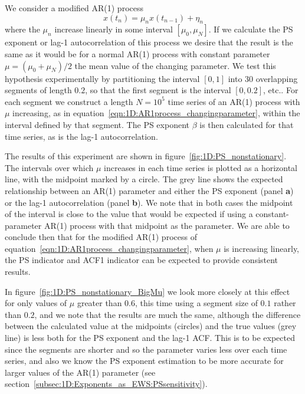{{{		We consider a modified AR(1) process
		\begin{equation}
			\label{eqn:1D:AR1process_changingparameter}
			x(t_n) = \mu_n x(t_{n-1})+\eta_n
		\end{equation}
		where the $\mu_n$ increase linearly in some interval $[\mu_0, \mu_N]$. If we calculate the PS exponent or lag-1 autocorrelation of this process we desire that the result is the same as it would be for a normal AR(1) process with constant parameter $\mu=(\mu_0+\mu_N)/2$ the mean value of the changing parameter. We test this hypothesis experimentally by partitioning the interval $[0,1]$ into $30$ overlapping segments of length $0.2$, so that the first segment is the interval $[0,0.2]$, etc.. For each segment we construct a length $N=10^5$ time series of an AR(1) process with $\mu$ increasing, as in equation~\ref{eqn:1D:AR1process_changingparameter}, within the interval defined by that segment. The PS exponent $\beta$ is then calculated for that time series, as is the lag-1 autocorrelation. 
		
		The results of this experiment are shown in figure~\ref{fig:1D:PS_nonstationary}. The intervals over which $\mu$ increases in each time series is plotted as a horizontal line, with the midpoint marked by a circle. The grey line shows the expected relationship between an AR(1) parameter and either the PS exponent (panel {\bf a}) or the lag-1 autocorrelation (panel {\bf b}). We note that in both cases the midpoint of the interval is close to the value that would be expected if using a constant-parameter AR(1) process with that midpoint as the parameter. We are able to conclude then that for the modified AR(1) process of equation~\ref{eqn:1D:AR1process_changingparameter}, when $\mu$ is increasing linearly, the PS indicator and ACF1 indicator can be expected to provide consistent results. 
		
		In figure~\ref{fig:1D:PS_nonstationary_BigMu} we look more closely at this effect for only values of $\mu$ greater than $0.6$, this time using a segment size of $0.1$ rather than $0.2$, and we note that the results are much the same, although the difference between the calculated value at the midpoints (circles) and the true values (grey line) is less both for the PS exponent and the lag-1 ACF. This is to be expected since the segments are shorter and so the parameter varies less over each time series, and also we know the PS exponent estimation to be more accurate for larger values of the AR(1) parameter (see section~\ref{subsec:1D:Exponents_as_EWS:PSsensitivity}).

}}}
